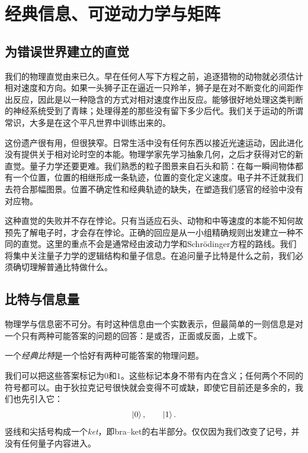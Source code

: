 \chapter{经典信息、可逆动力学与矩阵}


\section{为错误世界建立的直觉}

我们的物理直觉由来已久。早在任何人写下方程之前，追逐猎物的动物就必须估计相对速度和方向。如果一头狮子正在逼近一只羚羊，狮子是在对不断变化的间距作出反应，因此是以一种隐含的方式对相对速度作出反应。能够很好地处理这类判断的神经系统受到了青睐；处理得差的那些没有留下多少后代。我们关于运动的所谓常识，大多是在这个平凡世界中训练出来的。

这份遗产很有用，但很狭窄。日常生活中没有任何东西以接近光速运动，因此进化没有提供关于相对论时空的本能。物理学家先学习抽象几何，之后才获得对它的新直觉。量子力学还要更难。我们熟悉的粒子图景来自石头和箭：在每一瞬间物体都有一个位置，位置的相继形成一条轨迹，位置的变化定义速度。电子并不迁就我们去符合那幅图景。位置不确定性和经典轨迹的缺失，在塑造我们感官的经验中没有对应物。

这种直觉的失败并不存在悖论。只有当适应石头、动物和中等速度的本能不知何故预先了解电子时，才会存在悖论。正确的回应是从一小组精确规则出发建立一种不同的直觉。这里的重点不会是通常经由波动力学和Schr\"odinger方程的路线。我们将集中关注量子力学的逻辑结构和量子信息。在追问量子比特是什么之前，我们必须确切理解普通比特做什么。

\section{比特与信息量}

物理学与信息密不可分。有时这种信息由一个实数表示，但最简单的一则信息是对一个只有两种可能答案的问题的回答：是或否，正面或反面，上或下。

\begin{definition}
一个\emph{经典比特}是一个恰好有两种可能答案的物理问题。
\end{definition}

我们可以把这些答案标记为\(0\)和\(1\)。这些标记本身不带有内在含义；任何两个不同的符号都可以。由于狄拉克记号很快就会变得不可或缺，即使它目前还是多余的，我们也先引入它：
\begin{equation}
  \left\lvert0\right\rangle,
  \qquad
  \left\lvert1\right\rangle.
\end{equation}
竖线和尖括号构成一个\emph{ket}，即bra--ket的右半部分。仅仅因为我们改变了记号，并没有任何量子内容进入。

